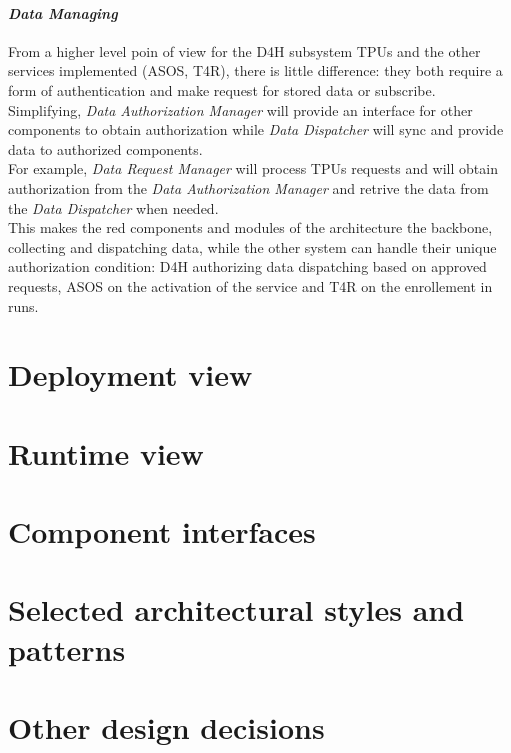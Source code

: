 \paragraph{\textit{Data Managing}} From a higher level poin of view for the D4H subsystem TPUs and the other services implemented (ASOS, T4R), there is little difference: they both require a form of authentication and make request for stored data or subscribe. \\
Simplifying, \textit{Data Authorization Manager} will provide an interface for other components to obtain authorization while \textit{Data Dispatcher} will sync and provide data to authorized components. \\
For example, \textit{Data Request Manager} will process TPUs requests and will obtain authorization from the \textit{Data Authorization Manager} and retrive the data from the \textit{Data Dispatcher} when needed. \\
This makes the red components and modules of the architecture the backbone, collecting and dispatching data, while the other system can handle their unique authorization condition: D4H authorizing data dispatching based on approved requests, ASOS on the activation of the service and T4R on the enrollement in runs.
\section{Deployment view}
\section{Runtime view}
\section{Component interfaces}
\section{Selected architectural styles and patterns}
\section{Other design decisions}
